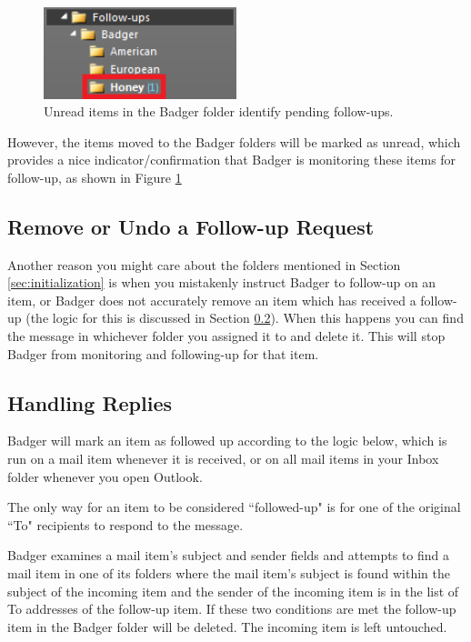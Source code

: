 \documentclass[12pt]{article}
\begin{document}
\begin{figure}
    \centering
    \includegraphics[width=0.5\textwidth]{pending-follow-up}
    \caption{Unread items in the Badger folder identify pending follow-ups.}
    \label{fig:pending-follow-up}
\end{figure}

However, the items moved to the Badger folders will be marked as unread, which provides a nice indicator/confirmation that Badger is monitoring these items for follow-up, as shown in Figure \ref{fig:pending-follow-up}

\subsection{Remove or Undo a Follow-up Request}

Another reason you might care about the folders mentioned in Section \ref{sec:initialization} is when you mistakenly instruct Badger to follow-up on an item, or Badger does not accurately remove an item which has received a follow-up (the logic for this is discussed in Section \ref{sec:handling-replies}). When this happens you can find the message in whichever folder you assigned it to and delete it. This will stop Badger from monitoring and following-up for that item.

\subsection{Handling Replies}
\label{sec:handling-replies}

Badger will mark an item as followed up according to the logic below, which is run on a mail item whenever it is received, or on all mail items in your Inbox folder whenever you open Outlook.

The only way for an item to be considered ``followed-up" is for one of the original ``To" recipients to respond to the message.

Badger examines a mail item's subject and sender fields and attempts to find a mail item in one of its folders where the mail item's subject is found within the subject of the incoming item and the sender of the incoming item is in the list of To addresses of the follow-up item.  If these two conditions are met the follow-up item in the Badger folder will be deleted. The incoming item is left untouched.
\end{document}
